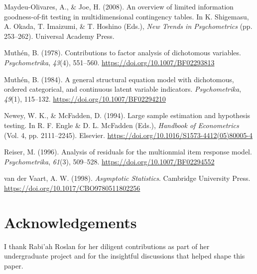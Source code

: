 \documentclass[
  letterpaper,
  DIV=11,
  numbers=noendperiod]{scrartcl}
\newlength{\cslhangindent}
\newenvironment{CSLReferences}[2] %
 {\begin{list}{}{%
  \setlength{\itemindent}{0pt}
  \setlength{\leftmargin}{0pt}
  \setlength{\parsep}{0pt}
  \ifodd #1
   \setlength{\leftmargin}{\cslhangindent}
   \setlength{\itemindent}{-1\cslhangindent}
  \fi
  \setlength{\itemsep}{#2\baselineskip}}}
 {\end{list}}
\begin{document}
\begin{CSLReferences}{1}{0}
Maydeu-Olivares, A., \& Joe, H. (2008). An overview of limited
information goodness-of-fit testing in multidimensional contingency
tables. In K. Shigemasu, A. Okada, T. Imaizumi, \& T. Hoshino (Eds.),
\emph{New {Trends} in {Psychometrics}} (pp. 253--262). Universal Academy
Press.

Muthén, B. (1978). Contributions to factor analysis of dichotomous
variables. \emph{Psychometrika}, \emph{43}(4), 551--560.
\url{https://doi.org/10.1007/BF02293813}

Muthén, B. (1984). A general structural equation model with dichotomous,
ordered categorical, and continuous latent variable indicators.
\emph{Psychometrika}, \emph{49}(1), 115--132.
\url{https://doi.org/10.1007/BF02294210}

Newey, W. K., \& McFadden, D. (1994). Large sample estimation and
hypothesis testing. In R. F. Engle \& D. L. McFadden (Eds.),
\emph{Handbook of {Econometrics}} (Vol. 4, pp. 2111--2245). Elsevier.
\url{https://doi.org/10.1016/S1573-4412(05)80005-4}

Reiser, M. (1996). Analysis of residuals for the multionmial item
response model. \emph{Psychometrika}, \emph{61}(3), 509--528.
\url{https://doi.org/10.1007/BF02294552}

van der Vaart, A. W. (1998). \emph{Asymptotic {Statistics}}. Cambridge
University Press. \url{https://doi.org/10.1017/CBO9780511802256}

\end{CSLReferences}

\section*{Acknowledgements}\label{acknowledgements}

I thank Rabi'ah Roslan for her diligent contributions as part of her
undergraduate project and for the insightful discussions that helped
shape this paper.
\end{document}
